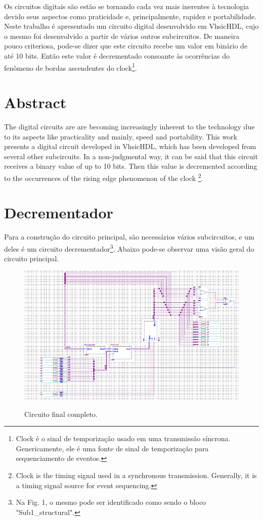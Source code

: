 \documentclass[12pt,a4paper]{article}
\begin{document}
Os circuitos digitais são estão se tornando cada vez mais inerentes à tecnologia devido seus aspectos como praticidade e, principalmente, rapidez e portabilidade. Neste trabalho é apresentado um circuito digital desenvolvido em VhsicHDL, cujo o mesmo foi desenvolvido a partir de vários outros subcircuitos. De maneira pouco criteriosa, pode-se dizer que este circuito recebe um valor em binário de até 10 bits. Então este valor é decrementado consoante às ocorrências do fenômeno de bordas ascendentes do clock\footnote{Clock é o sinal de temporização usado em uma transmissão síncrona. Genericamente, ele é uma fonte de sinal de temporização para sequenciamento de eventos.}.

\newpage %

\section*{Abstract}
The digital circuits are are becoming increasingly inherent to the technology due to its aspects like practicality and mainly, speed and portability. This work presents a digital circuit developed in VhsicHDL, which has been developed from several other subcircuits. In a non-judgmental way, it can be said that this circuit receives a binary value of up to 10 bits. Then this value is decremented according to the occurrences of the rising edge phenomenon of the clock \footnote[1] {Clock is the timing signal used in a synchronous transmission. Generally, it is a timing signal source for event sequencing.}.

\newpage %

\section{Decrementador}
Para a construção do circuito principal, são necessários vários subcircuitos, e um deles é um circuito decrementador\footnote{Na Fig. 1, o mesmo pode ser identificado como sendo o bloco "Sub1\_structural".}. Abaixo pode-se observar uma visão geral do circuito principal.
\begin{figure}[h]\centering\includegraphics[scale=0.8]{circuit.png}\\ \caption{Circuito final completo.}\label{img:circuit}\end{figure}
\end{document}
